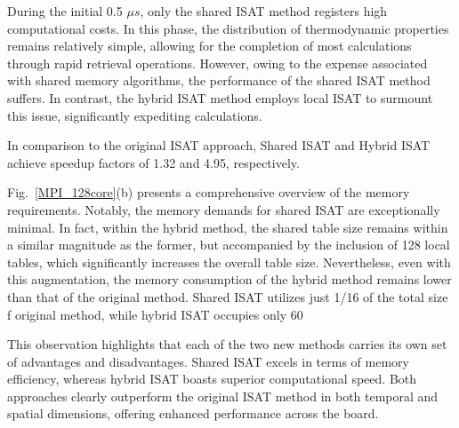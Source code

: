 During the initial 0.5 $\mu s$, only the shared ISAT method registers high computational costs. In this phase, the distribution of thermodynamic properties remains relatively simple, allowing for the completion of most calculations through rapid retrieval operations. However, owing to the expense associated with shared memory algorithms, the performance of the shared ISAT method suffers. In contrast, the hybrid ISAT method employs local ISAT to surmount this issue, significantly expediting calculations.

In comparison to the original ISAT approach, Shared ISAT and Hybrid ISAT achieve speedup factors of 1.32 and 4.95, respectively.


Fig.~\ref{MPI_128core}(b) presents a comprehensive overview of the memory requirements. Notably, the memory demands for shared ISAT are exceptionally minimal. In fact, within the hybrid method, the shared table size remains within a similar magnitude as the former, but accompanied by the inclusion of 128 local tables, which significantly increases the overall table size. Nevertheless, even with this augmentation, the memory consumption of the hybrid method remains lower than that of the original method. Shared ISAT utilizes just 1/16 of the total size f original method, while hybrid ISAT occupies only 60%

This observation highlights that each of the two new methods carries its own set of advantages and disadvantages. Shared ISAT excels in terms of memory efficiency, whereas hybrid ISAT boasts superior computational speed. Both approaches clearly outperform the original ISAT method in both temporal and spatial dimensions, offering enhanced performance across the board.




